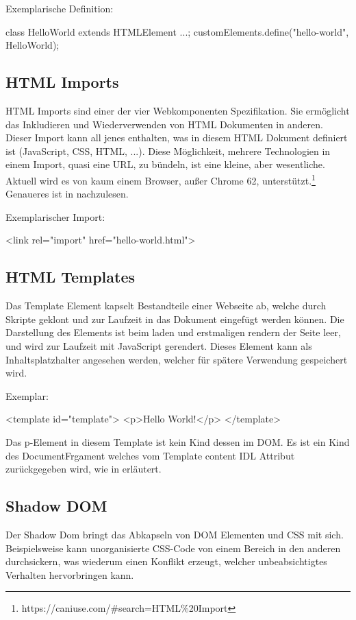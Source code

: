 Exemplarische Definition:
\begin{JsCode}
	class HelloWorld extends HTMLElement {...};
	customElements.define("hello-world", HelloWorld);
\end{JsCode}

\subsection{HTML Imports}
HTML Imports sind einer der vier Webkomponenten Spezifikation. Sie ermöglicht das Inkludieren und Wiederverwenden von HTML Dokumenten in anderen. Dieser Import kann all jenes enthalten, was in diesem HTML Dokument definiert ist (JavaScript, CSS, HTML, ...). 
Diese Möglichkeit, mehrere Technologien in einem Import, quasi eine URL, zu bündeln, ist eine kleine, aber wesentliche. Aktuell wird es von kaum einem Browser, außer Chrome 62,  unterstützt.\footnote{https://caniuse.com/\#search=HTML\%20Import} Genaueres ist in \cite{html-imports} nachzulesen.

Exemplarischer Import:
\begin{JsCode}
	<link rel="import" href="hello-world.html">
\end{JsCode}

\subsection{HTML Templates}
Das Template Element kapselt Bestandteile einer Webseite ab, welche durch Skripte geklont und zur Laufzeit in das Dokument eingefügt werden können. Die Darstellung des Elements ist beim laden und erstmaligen rendern der Seite leer, und wird zur Laufzeit mit JavaScript gerendert. Dieses Element kann als Inhaltsplatzhalter angesehen werden, welcher für spätere Verwendung gespeichert wird. 

Exemplar:
\begin{JsCode}
  <template id="template">
  		<p>Hello World!</p>
  </template>
\end{JsCode}
Das p-Element in diesem Template ist kein Kind dessen im DOM. Es ist ein Kind des DocumentFrgament welches vom Template content IDL Attribut zurückgegeben wird, wie in \cite{html-templates} erläutert.

\subsection{Shadow DOM}
Der Shadow Dom bringt das Abkapseln von DOM Elementen und CSS mit sich. Beispielsweise kann unorganisierte CSS-Code von einem Bereich in den anderen durchsickern, was wiederum einen Konflikt erzeugt, welcher unbeabsichtigtes Verhalten hervorbringen kann. 

